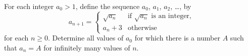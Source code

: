 For each integer $a_0 > 1$, define the sequence $a_0$, $a_1$, $a_2$,
\dots, by
\[
  a_{n+1} =
  \begin{cases}
    \sqrt{a_n} & \text{if $\sqrt{a_n}$ is an integer,} \\
    a_n + 3 & \text{otherwise}
  \end{cases}
\]
for each $n \ge 0$.
Determine all values of $a_0$ for which there is a number $A$
such that $a_n = A$ for infinitely many values of $n$.